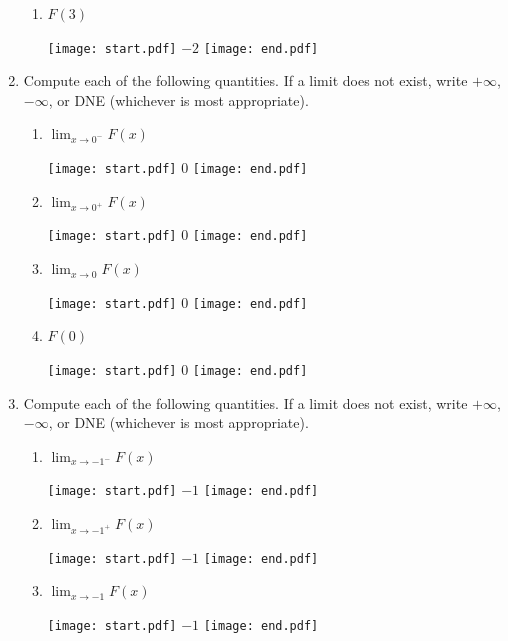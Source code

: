 \documentclass[12pt]{article}
\begin{document}
\begin{enumerate}
\begin{enumerate}
\item $F(3)$

\texttt{[image: start.pdf]}
{{$-2$}}
\texttt{[image: end.pdf]}


\end{enumerate}

\item Compute each of the following quantities.  If a limit does not exist, write $+\infty$, $-\infty$, or DNE (whichever is most appropriate). 

\begin{enumerate}

\item $\displaystyle \lim_{x \rightarrow 0^{-}}{F(x)}$

\texttt{[image: start.pdf]}
{{$0$}}
\texttt{[image: end.pdf]}


\item $\displaystyle \lim_{x \rightarrow 0^{+}}{F(x)}$

\texttt{[image: start.pdf]}
{{$0$}}
\texttt{[image: end.pdf]}


\item $\displaystyle \lim_{x \rightarrow 0}{F(x)}$

\texttt{[image: start.pdf]}
{{$0$}}
\texttt{[image: end.pdf]}


\item $F(0)$

\texttt{[image: start.pdf]}
{{$0$}}
\texttt{[image: end.pdf]}


\end{enumerate}

\item Compute each of the following quantities.  If a limit does not exist, write $+\infty$, $-\infty$, or DNE (whichever is most appropriate). 

\begin{enumerate}

\item $\displaystyle \lim_{x \rightarrow -1^{-}}{F(x)}$

\texttt{[image: start.pdf]}
{{$-1$}}
\texttt{[image: end.pdf]}


\item $\displaystyle \lim_{x \rightarrow -1^{+}}{F(x)}$

\texttt{[image: start.pdf]}
{{$-1$}}
\texttt{[image: end.pdf]}


\item $\displaystyle \lim_{x \rightarrow -1}{F(x)}$

\texttt{[image: start.pdf]}
{{$-1$}}
\texttt{[image: end.pdf]}



\end{enumerate}
\end{enumerate}
\end{document}
